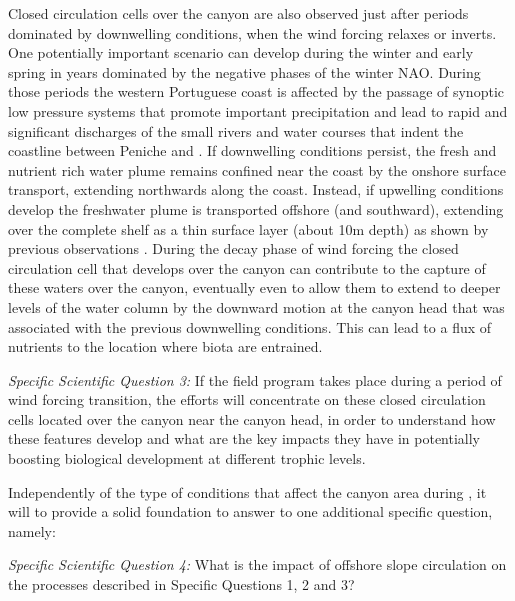 \begin{description}
Closed circulation cells over the canyon are also observed just after
periods dominated by downwelling conditions, when the wind forcing
relaxes or inverts. One potentially important scenario can develop
during the winter and early spring in years dominated by the negative
phases of the winter NAO. During those periods the western Portuguese
coast is affected by the passage of synoptic low pressure systems that
promote important precipitation and lead to rapid and significant
discharges of the small rivers and water courses that indent the
coastline between Peniche and \naze.  If downwelling conditions
persist, the fresh and nutrient rich water plume remains confined near
the coast by the onshore surface transport, extending northwards along
the coast. Instead, if upwelling conditions develop the freshwater
plume is transported offshore (and southward), extending over the
complete shelf as a thin surface layer (about 10m depth) as shown by
previous observations \cite{martins10}. During the decay phase of wind
forcing the closed circulation cell that develops over the canyon can
contribute to the capture of these waters over the canyon, eventually
even to allow them to extend to deeper levels of the water column by
the downward motion at the canyon head that was associated with the
previous downwelling conditions. This can lead to a flux of nutrients
to the location where biota are entrained.


\textsl{Specific Scientific Question 3:} If the \proj field program
takes place during a period of wind forcing transition, the efforts
will concentrate on these closed circulation cells located over the
canyon near the canyon head, in order to understand how these features
develop and what are the key impacts they have in potentially boosting
biological development at different trophic levels.

Independently of the type of conditions that affect the \naz canyon
area during \proje, it will to provide a solid foundation to answer to
one additional specific question, namely:

\textsl{Specific Scientific Question 4:} What is the impact of
offshore slope circulation on the processes described in Specific
Questions 1, 2 and 3?


\end{description}
